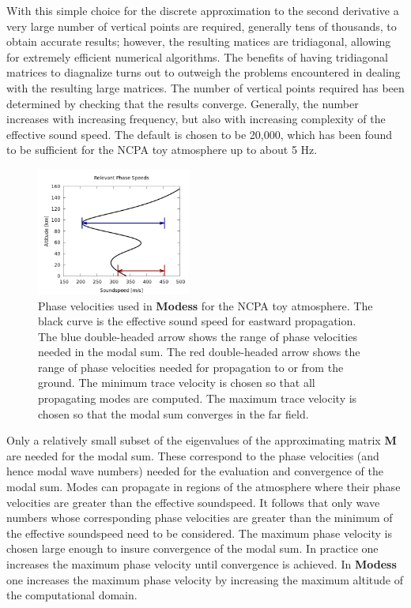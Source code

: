 With this simple choice for the discrete approximation to the second derivative a very large number of vertical points are required, generally tens of thousands, to obtain accurate results; however, the resulting matices are tridiagonal, allowing for extremely efficient numerical algorithms. The benefits of having tridiagonal matrices to diagnalize turns out to outweigh the problems encountered in dealing with the resulting large matrices. The number of vertical points required has been determined by checking that the results converge. Generally, the number increases with increasing frequency, but also with increasing complexity of the effective sound speed. The default is chosen to be 20,000, which has been found to be sufficient for the NCPA toy atmosphere up to about 5 Hz. 

\begin{figure}
\begin{center}
\includegraphics[width=0.45\textwidth]{figs/wvnums_modess}
\end{center}
\caption{Phase velocities used in {\bf Modess} for the NCPA toy atmosphere. The black curve is the effective sound speed for eastward propagation. The blue double-headed arrow shows the range of phase velocities needed in the modal sum. The red double-headed arrow shows the range of phase velocities needed for propagation to or from the ground. The minimum trace velocity is chosen so that all propagating modes are computed. The maximum trace velocity is chosen so that the modal sum converges in the far field. }
\label{fig:wvnums_modess}
\end{figure}

Only a relatively small subset of the eigenvalues of the approximating matrix \textbf{M} are needed for the modal sum. These correspond to the phase velocities (and hence modal wave numbers) needed for the evaluation and convergence of the modal sum. Modes can propagate in regions of the atmosphere where their phase velocities are greater than the effective soundspeed. It follows that only wave numbers whose corresponding phase velocities are greater than the minimum of the effective soundspeed need to be considered. The maximum phase velocity is chosen large enough to insure convergence of the modal sum. In practice one increases the maximum phase velocity until convergence is achieved. In {\bf Modess} one increases the maximum phase velocity by increasing the maximum altitude of the computational domain. 

